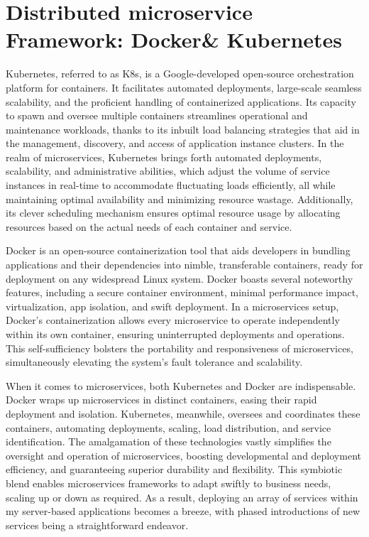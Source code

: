 \documentclass[12pt,two side]{report}
\begin{document}
\section{Distributed microservice Framework: Docker\& Kubernetes}
Kubernetes, referred to as K8s, is a Google-developed open-source orchestration platform for containers. It facilitates automated deployments, large-scale seamless scalability, and the proficient handling of containerized applications\cite{kubernetes_website}. Its capacity to spawn and oversee multiple containers streamlines operational and maintenance workloads, thanks to its inbuilt load balancing strategies that aid in the management, discovery, and access of application instance clusters\cite{kubernetes_website}. In the realm of microservices, Kubernetes brings forth automated deployments, scalability, and administrative abilities, which adjust the volume of service instances in real-time to accommodate fluctuating loads efficiently, all while maintaining optimal availability and minimizing resource wastage. Additionally, its clever scheduling mechanism ensures optimal resource usage by allocating resources based on the actual needs of each container and service.\newline

Docker is an open-source containerization tool that aids developers in bundling applications and their dependencies into nimble, transferable containers, ready for deployment on any widespread Linux system. Docker boasts several noteworthy features, including a secure container environment, minimal performance impact, virtualization, app isolation, and swift deployment\cite{docker_website}. In a microservices setup, Docker's containerization allows every microservice to operate independently within its own container, ensuring uninterrupted deployments and operations. This self-sufficiency bolsters the portability and responsiveness of microservices, simultaneously elevating the system's fault tolerance and scalability.\newline

When it comes to microservices, both Kubernetes and Docker are indispensable. Docker wraps up microservices in distinct containers, easing their rapid deployment and isolation. Kubernetes, meanwhile, oversees and coordinates these containers, automating deployments, scaling, load distribution, and service identification. The amalgamation of these technologies vastly simplifies the oversight and operation of microservices, boosting developmental and deployment efficiency, and guaranteeing superior durability and flexibility. This symbiotic blend enables microservices frameworks to adapt swiftly to business needs, scaling up or down as required. As a result, deploying an array of services within my server-based applications becomes a breeze, with phased introductions of new services being a straightforward endeavor.
\end{document}
